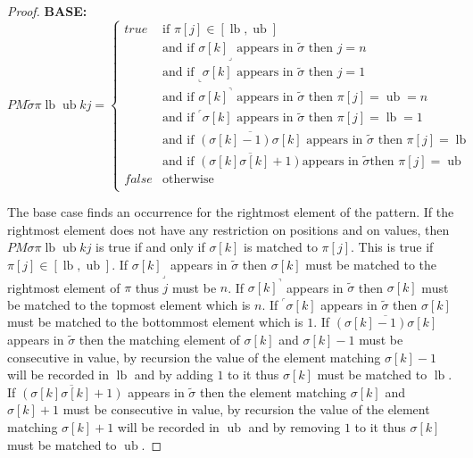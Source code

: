 \documentclass[a4paper]{llncs}
\newcommand{\ptext}{\pi}
\newcommand{\ppattern}{\sigma}
\newcommand{\PM}{PM}
\DeclareMathOperator{\lb}{lb}
\DeclareMathOperator{\ub}{ub}
\begin{document}
\begin{proof}
\noindent\textbf{BASE:} \\
$$
\PM{\widetilde{\sigma}}{\ptext}{\lb}{\ub}{k}{j}=
\begin{cases}
	true 	& \text{if $\ptext[j] \in [\lb,\ub ]$}\\
			& \text{and if ${\ppattern[k]}_\lrcorner$ appears in $\widetilde{\sigma}$ then $j=n$}\\
			& \text{and if $_\llcorner{\sigma[k]}$ appears in $\widetilde{\sigma}$ then $j=1$}\\
			& \text{and if ${\ppattern[k]}^\urcorner$ appears in $\widetilde{\sigma}$ then $\ptext[j]=\ub=n$}\\
			& \text{and if  $^\ulcorner{\ppattern[k]}$ appears in $\widetilde{\sigma}$ then $\ptext[j]=\lb=1$ } \\
			& \text{and if  $\overline{(\ppattern[k]-1)\ppattern[k]}$ appears in $\widetilde{\sigma}$ then $\ptext[j]=\lb$ }  \\
			& \text{and if  $\overline{(\ppattern[k]\ppattern[k]+1)}$
			appears in $\widetilde{\sigma}$
			then $\ptext[j]=\ub$}  \\

	false	& \text{otherwise} \\
\end{cases}
$$

The base case finds an occurrence for the rightmost element of the pattern. If the rightmost element does not have any restriction on positions and on values, then $\PM{\sigma}{\ptext}{\lb}{\ub}{k}{j}$ is true if and only if $\ppattern[k]$ is matched to $\ptext[j]$. This is true if $\ptext[j] \in [\lb,\ub]$. If ${\ppattern[k]}_\lrcorner$ appears in $\widetilde{\sigma}$ then $\ppattern[k]$ must be matched to the rightmost element of $\pi$ thus $j$ must be $n$. If ${\ppattern[k]}^\urcorner$ appears in $\widetilde{\sigma}$ then $\ppattern[k]$ must be matched to the topmost element which is $n$. If $^\ulcorner{\ppattern[k]}$ appears in $\widetilde{\sigma}$ then $\ppattern[k]$ must be matched to the bottommost element which is $1$.
If  $\overline{(\ppattern[k]-1)\ppattern[k] }$ appears in $\widetilde{\sigma}$ then the matching element of $\ppattern[k]$ and $\ppattern[k]-1$ must be consecutive in value, by recursion the value of the element matching $\ppattern[k]-1$ will be recorded in $\lb$ and by adding $1$ to it thus $\ppattern[k]$ must be matched to $\lb$.
If  $\overline{(\ppattern[k]\ppattern[k]+1)}$ appears in $\widetilde{\sigma}$ then the element matching $\ppattern[k]$ and $\ppattern[k]+1$ must be consecutive in value, by recursion the value of the  element matching $\ppattern[k]+1$ will be recorded in $\ub$ and by removing $1$ to it thus $\ppattern[k]$ must be matched to $\ub$.


\end{proof}
\end{document}
